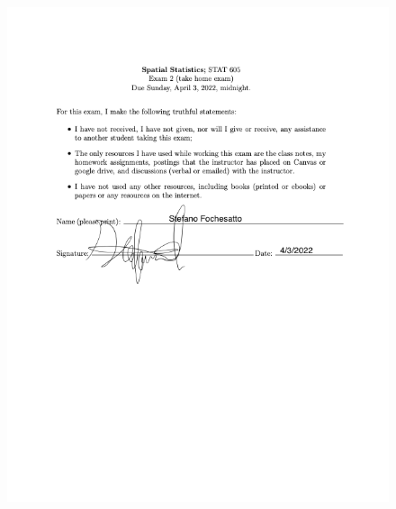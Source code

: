 \documentclass[12pt]{article}
\theoremstyle{homework}
\begin{document}
\begin{figure}[H]
  \begin{center}
  \includegraphics[width = \textwidth]{SignaturePage.png}
  \end{center}
\end{figure} 
\end{document}
